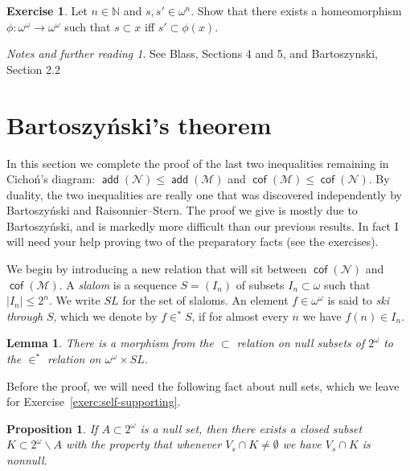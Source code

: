 \documentclass[11pt,oneside]{amsbook}
\newcommand{\N}{\mathbb N}
\newcommand{\Null}{\mathcal N}
\newcommand{\Meager}{\mathcal M}
\DeclareMathOperator{\add}{\mathsf{add}}
\DeclareMathOperator{\cof}{\mathsf{cof}}
\theoremstyle{definition}
\newtheorem{exercise}{Exercise}[section]
\theoremstyle{plain}
\newtheorem{lemma}[theorem]{Lemma}
\newtheorem{proposition}[theorem]{Proposition}
\theoremstyle{definition}
\theoremstyle{remark}
\newtheorem*{notes}{Notes and further reading}
\numberwithin{equation}{section}
\numberwithin{figure}{section}
\begin{document}
\begin{exercise}
  \label{exerc:homeo}
  Let $n\in\N$ and $s,s'\in\omega^n$. Show that there exists a homeomorphism $\phi\colon\omega^\omega\to\omega^\omega$ such that $s\subset x$ iff $s'\subset\phi(x)$.
\end{exercise}

\begin{notes}
  See Blass, Sections 4 and 5, and Bartoszynski, Section 2.2
\end{notes}


\newpage
\section{Bartoszy\'nski's theorem}

In this section we complete the proof of the last two inequalities remaining in Cicho\'n's diagram: $\add(\Null)\leq\add(\Meager)$ and $\cof(\Meager)\leq\cof(\Null)$. By duality, the two inequalities are really one that was discovered independently by Bartoszy\'nski and Raisonnier--Stern. The proof we give is mostly due to Bartoszy\'nski, and is markedly more difficult than our previous results. In fact I will need your help proving two of the preparatory facts (see the exercises).

We begin by introducing a new relation that will sit between $\cof(\Null)$ and $\cof(\Meager)$. A \emph{slalom} is a sequence $S=(I_n)$ of subsets $I_n\subset\omega$ such that $|I_n|\leq2^n$. We write $SL$ for the set of slaloms. An element $f\in\omega^\omega$ is said to \emph{ski through} $S$, which we denote by $f\in^*S$, if for almost every $n$ we have $f(n)\in I_n$.

\begin{lemma}
  \label{lem:null-slalom}
  There is a morphism from the $\subset$ relation on null subsets of $2^\omega$ to the $\in^*$ relation on $\omega^\omega\times SL$.
\end{lemma}

Before the proof, we will need the following fact about null sets, which we leave for Exercise~\ref{exerc:self-supporting}.

\begin{proposition}
  \label{prop:self-supporting}
  If $A\subset2^\omega$ is a null set, then there exists a closed subset $K\subset2^\omega\smallsetminus A$ with the property that whenever $V_s\cap K\neq\emptyset$ we have $V_s\cap K$ is nonnull.
\end{proposition}
\end{document}
